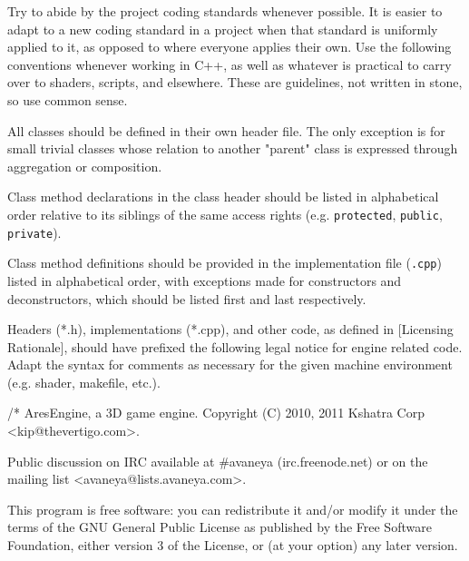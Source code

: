 

Try to abide by the project coding standards whenever possible. It is easier to adapt to a new coding standard in a project when that standard is uniformly applied to it, as opposed to where everyone applies their own. Use the following conventions whenever working in C++, as well as whatever is practical to carry over to shaders, scripts, and elsewhere. These are guidelines, not written in stone, so use common sense.


\startitemize[3]
\setupwhitespace[big]
\item
All classes should be defined in their own header file. The only exception is for small trivial classes whose relation to another "parent" class is expressed through aggregation or composition.

\item
Class method declarations in the class header should be listed in alphabetical order relative to its siblings of the same access rights (e.g. {\tt protected}, {\tt public}, {\tt private}).

\item
Class method definitions should be provided in the implementation file ({\tt *.cpp}) listed in alphabetical order, with exceptions made for constructors and deconstructors, which should be listed first and last respectively.
\stopitemize

Headers (*.h), implementations (*.cpp), and other code, as defined in [Licensing Rationale], should have prefixed the following legal notice for engine related code. Adapt the syntax for comments as necessary for the given machine environment (e.g. shader, makefile, etc.).

\startCodeExample
\starttyping
/*
    AresEngine, a 3D game engine.
    Copyright (C) 2010, 2011 Kshatra Corp <kip@thevertigo.com>.

    Public discussion on IRC available at #avaneya (irc.freenode.net)
    or on the mailing list <avaneya@lists.avaneya.com>.

    This program is free software: you can redistribute it and/or modify
    it under the terms of the GNU General Public License as published by
    the Free Software Foundation, either version 3 of the License, or
    (at your option) any later version.

